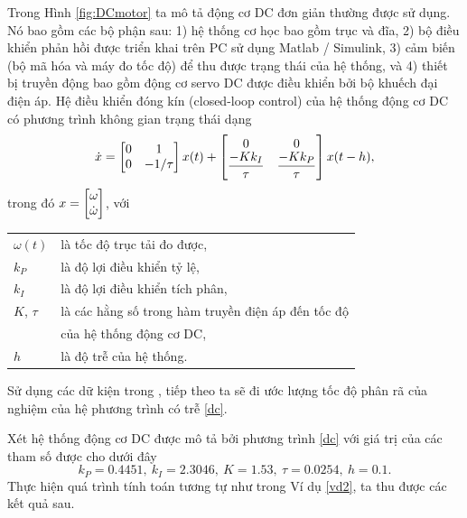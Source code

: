 Trong Hình \ref{fig:DCmotor} ta mô tả động cơ DC đơn giản thường được sử dụng. Nó bao gồm các bộ phận sau: 1) hệ thống cơ học bao gồm trục và đĩa, 2) bộ điều khiển phản hồi được triển khai trên PC sử dụng Matlab / Simulink, 3) cảm biến (bộ mã hóa và máy đo tốc độ) để thu được trạng thái của hệ thống, và 4) thiết bị truyền động bao gồm động cơ servo DC được điều khiển bởi bộ khuếch đại điện áp.
%
Hệ điều khiển đóng kín (closed-loop control) của hệ thống động cơ DC có phương trình không gian trạng thái dạng
%
\begin{equation}\label{dc}
\dot{x} = 
\begin{bmatrix} 0 & 1 \\ 0 & -1/\tau \end{bmatrix} x(t)
+ 
\begin{bmatrix} 0 & 0 \\ \dfrac{-K k_I}{\tau} & \dfrac{-K k_P}{\tau} \end{bmatrix} x(t-h),
\end{equation}
%
trong đó $x = \begin{bmatrix} \omega \\ \dot{\omega} \end{bmatrix}$, với \\
%
\begin{center}
\begin{tabular}{ll}
  $\omega(t)$   &   là tốc độ trục tải đo được,  \\
 $k_P$          &   là độ lợi điều khiển tỷ lệ,  \\
    $k_I$       &   là độ lợi điều khiển tích phân, \\
    $K$, $\tau$ &   là các hằng số trong hàm truyền điện áp đến tốc độ  \\ 
                & của hệ thống động cơ DC, \\
    $h$         & là độ trễ của hệ thống.
\end{tabular} 
\end{center}
%
Sử dụng các dữ kiện trong \cite{Dua12}, tiếp theo ta sẽ đi ước lượng tốc độ phân rã của nghiệm của hệ phương trình có trễ \eqref{dc}.

\begin{vd}
Xét hệ thống động cơ DC được mô tả bởi phương trình \eqref{dc} với giá trị của các tham số được cho dưới đây
%
\begin{equation*}
 k_P = 0.4451, \ k_I =  2.3046, \    K = 1.53, \ \tau = 0.0254 , \ h = 0.1.   
\end{equation*}
%
Thực hiện quá trình tính toán tương tự như trong Ví dụ \ref{vd2}, ta thu được các kết quả sau.

\end{vd}

